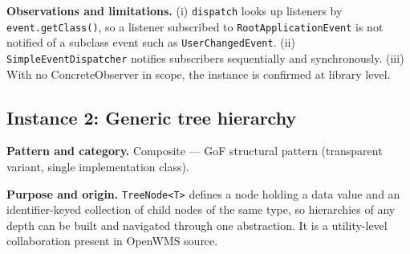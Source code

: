 \documentclass[11pt,a4paper]{article}
\newcommand{\code}[1]{\nolinkurl{#1}}
\begin{document}
\begin{center}
\end{center}
\textbf{Observations and limitations.} (i) \code{dispatch} looks up listeners by \code{event.getClass()}, so a listener subscribed to \code{RootApplicationEvent} is not notified of a subclass event such as \code{UserChangedEvent}. (ii) \code{SimpleEventDispatcher} notifies subscribers sequentially and synchronously. (iii) With no ConcreteObserver in scope, the instance is confirmed at library level.

\subsection{Instance 2: Generic tree hierarchy}
\textbf{Pattern and category.} Composite --- GoF structural pattern (transparent variant, single implementation class).

\textbf{Purpose and origin.} \code{TreeNode<T>} defines a node holding a data value and an identifier-keyed collection of child nodes of the same type, so hierarchies of any depth can be built and navigated through one abstraction. It is a utility-level collaboration present in OpenWMS source.
\end{document}
